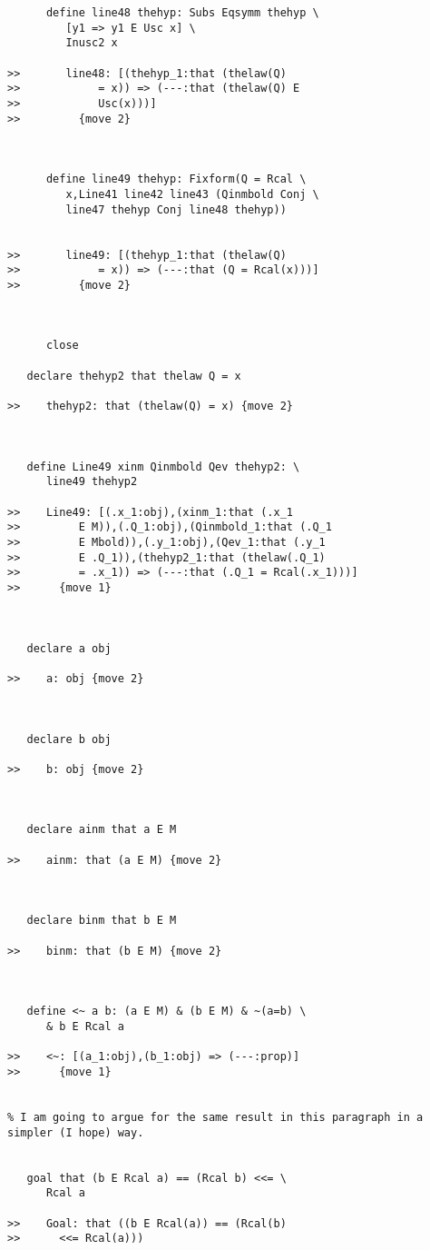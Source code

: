 \documentclass[12pt]{article}
\begin{document}
\begin{verbatim}
      define line48 thehyp: Subs Eqsymm thehyp \
         [y1 => y1 E Usc x] \
         Inusc2 x

>>       line48: [(thehyp_1:that (thelaw(Q)
>>            = x)) => (---:that (thelaw(Q) E
>>            Usc(x)))]
>>         {move 2}



      define line49 thehyp: Fixform(Q = Rcal \
         x,Line41 line42 line43 (Qinmbold Conj \
         line47 thehyp Conj line48 thehyp))


>>       line49: [(thehyp_1:that (thelaw(Q)
>>            = x)) => (---:that (Q = Rcal(x)))]
>>         {move 2}



      close

   declare thehyp2 that thelaw Q = x

>>    thehyp2: that (thelaw(Q) = x) {move 2}



   define Line49 xinm Qinmbold Qev thehyp2: \
      line49 thehyp2

>>    Line49: [(.x_1:obj),(xinm_1:that (.x_1
>>         E M)),(.Q_1:obj),(Qinmbold_1:that (.Q_1
>>         E Mbold)),(.y_1:obj),(Qev_1:that (.y_1
>>         E .Q_1)),(thehyp2_1:that (thelaw(.Q_1)
>>         = .x_1)) => (---:that (.Q_1 = Rcal(.x_1)))]
>>      {move 1}



   declare a obj

>>    a: obj {move 2}



   declare b obj

>>    b: obj {move 2}



   declare ainm that a E M

>>    ainm: that (a E M) {move 2}



   declare binm that b E M

>>    binm: that (b E M) {move 2}



   define <~ a b: (a E M) & (b E M) & ~(a=b) \
      & b E Rcal a

>>    <~: [(a_1:obj),(b_1:obj) => (---:prop)]
>>      {move 1}


% I am going to argue for the same result in this paragraph in a simpler (I hope) way.


   goal that (b E Rcal a) == (Rcal b) <<= \
      Rcal a

>>    Goal: that ((b E Rcal(a)) == (Rcal(b)
>>      <<= Rcal(a)))


\end{verbatim}
\end{document}
